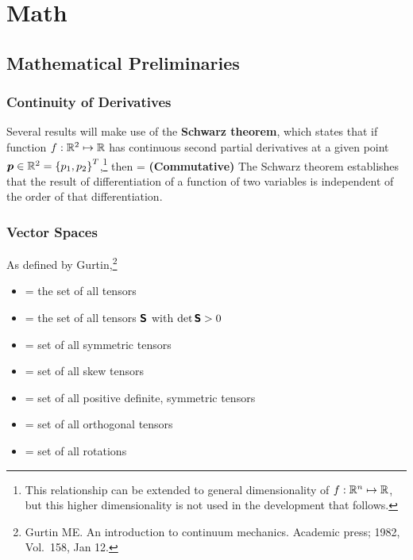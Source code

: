 \chapter{Math}
\section{Mathematical Preliminaries}
\subsection{Continuity of Derivatives}
Several results will make use
of the {\bf Schwarz theorem}, which 
states that if function $f : \mathbb{R}^2 \mapsto \mathbb{R}$ has continuous 
second partial derivatives at a given point $\mbox{\boldmath $p$} \in \mathbb{R}^2 = 
\left\{p_1, p_2\right\}^T$,\footnote{This relationship can be 
extended to general dimensionality of 
$f : \mathbb{R}^n \mapsto \mathbb{R}$, but this higher dimensionality is not used
in the development that follows.}
then 
\be
 \dst{} = 
 \dst{}
 \hspace{1.0cm}\mbox{\bf (Commutative)}
 \label{eq:schwarz}
\ee
The Schwarz theorem establishes that the result of differentiation
of a function of two variables is independent of the order of 
that differentiation.


\subsection{Vector Spaces}
As defined by Gurtin,\footnote{Gurtin ME. An introduction to 
continuum mechanics. Academic press; 1982, Vol.~158, Jan 12.}
\begin{itemize}
\item \lin =  the set of all tensors
\item \linplus =  the set of all tensors $\mbox{\sffamily\bfseries S}$ with $\det \mbox{\sffamily\bfseries S} > 0$
\item \sym =  set of all symmetric tensors
\item \skw =  set of all skew tensors
\item \psym =  set of all positive definite, symmetric tensors
\item \orth =  set of all orthogonal tensors
\item \orthplus =  set of all rotations  
\end{itemize}



